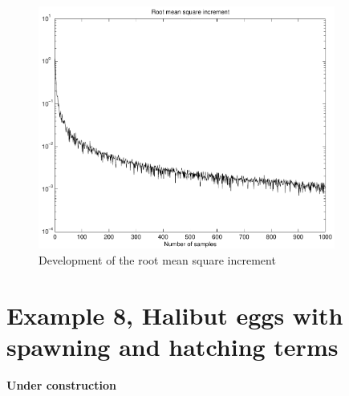 \begin{figure}[!htb]
\begin{center}
\includegraphics[height=8cm]{ex7b}
\end{center}
\caption{Development of the root mean square increment}
\label{fig:ex7b}
\end{figure}

\section{Example 8, Halibut eggs with spawning and hatching terms}
{\bfseries Under construction}


